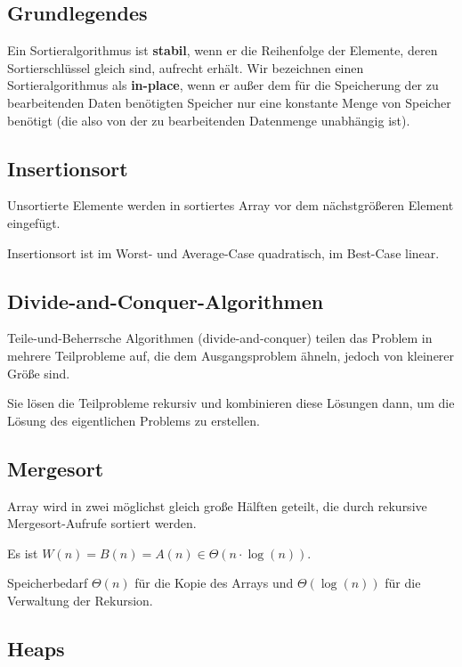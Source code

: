 \documentclass[12pt]{article}
\begin{document}
\subsection{Grundlegendes}

Ein Sortieralgorithmus ist \textbf{stabil}, wenn er die Reihenfolge der Elemente, deren Sortierschlüssel gleich sind, aufrecht erhält. Wir bezeichnen einen Sortieralgorithmus als \textbf{in-place}, wenn er außer dem für die Speicherung der zu bearbeitenden Daten benötigten Speicher nur eine konstante Menge von Speicher benötigt (die also von der zu bearbeitenden Datenmenge unabhängig ist).

\subsection{Insertionsort}

Unsortierte Elemente werden in sortiertes Array vor dem nächstgrößeren Element eingefügt.

Insertionsort ist im Worst- und Average-Case quadratisch, im Best-Case linear.

\subsection{Divide-and-Conquer-Algorithmen}

Teile-und-Beherrsche Algorithmen (divide-and-conquer) teilen das Problem in mehrere Teilprobleme auf, die dem Ausgangsproblem ähneln, jedoch von kleinerer Größe sind.

Sie lösen die Teilprobleme rekursiv und kombinieren diese Lösungen dann, um die Lösung des eigentlichen Problems zu erstellen.

\subsection{Mergesort}

Array wird in zwei möglichst gleich große Hälften geteilt, die durch rekursive Mergesort-Aufrufe sortiert werden.

Es ist $W(n) = B(n) = A(n) \in \Theta(n \cdot{} \log(n))$.

Speicherbedarf $\Theta(n)$ für die Kopie des Arrays und $\Theta(\log(n))$ für die Verwaltung der Rekursion.

\subsection{Heaps}
\end{document}
